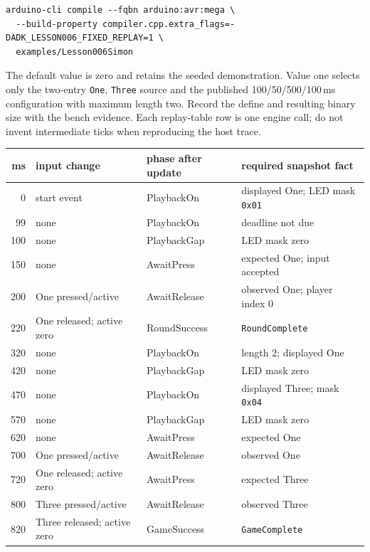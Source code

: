 \documentclass[11pt]{article}
\begin{document}
\begin{lstlisting}[style=adkcpp]
arduino-cli compile --fqbn arduino:avr:mega \
  --build-property compiler.cpp.extra_flags=-DADK_LESSON006_FIXED_REPLAY=1 \
  examples/Lesson006Simon
\end{lstlisting}

The default value is zero and retains the seeded demonstration. Value one
selects only the two-entry \texttt{One}, \texttt{Three} source and the published
100/50/500/100\,ms configuration with maximum length two. Record the define
and resulting binary size with the bench evidence. Each replay-table row is
one engine call; do not invent intermediate ticks when reproducing the host
trace.

\begin{center}
\small
\begin{tabularx}{\linewidth}{@{}r l l X@{}}
\toprule
ms & input change & phase after update & required snapshot fact\\
\midrule
0   & start event & PlaybackOn & displayed One; LED mask \texttt{0x01}\\
99  & none & PlaybackOn & deadline not due\\
100 & none & PlaybackGap & LED mask zero\\
150 & none & AwaitPress & expected One; input accepted\\
200 & One pressed/active & AwaitRelease & observed One; player index 0\\
220 & One released; active zero & RoundSuccess & \texttt{RoundComplete}\\
320 & none & PlaybackOn & length 2; displayed One\\
420 & none & PlaybackGap & LED mask zero\\
470 & none & PlaybackOn & displayed Three; mask \texttt{0x04}\\
570 & none & PlaybackGap & LED mask zero\\
620 & none & AwaitPress & expected One\\
700 & One pressed/active & AwaitRelease & observed One\\
720 & One released; active zero & AwaitPress & expected Three\\
800 & Three pressed/active & AwaitRelease & observed Three\\
820 & Three released; active zero & GameSuccess & \texttt{GameComplete}\\
\bottomrule
\end{tabularx}
\end{center}
\end{document}
